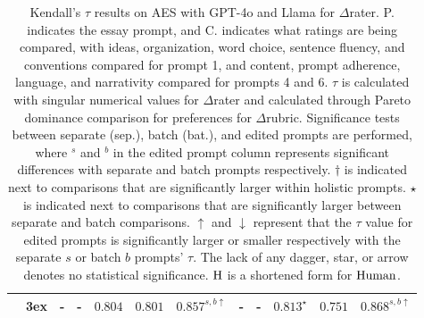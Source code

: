 \begin{table}[!ht]
\begin{tabular}{|w{c}{0.05cm}|w{c}{0.3cm}||c|c||c|c|c||c|c||c|c|c|}
        & 3ex&- &- & $0.804$& $0.801$& $0.857^{s,b\uparrow}$ &- &- & $0.813^{\star}$& $0.751$& $0.868^{s,b\uparrow}$\\
        \hline
    \end{tabular}
    \caption{Kendall's $\tau$ results on AES with GPT-4o and Llama for $\Delta$rater. P. indicates the essay prompt, and C. indicates what ratings are being compared, with ideas, organization, word choice, sentence fluency, and conventions compared for prompt 1, and content, prompt adherence, language, and narrativity compared for prompts 4 and 6. $\tau$ is calculated with singular numerical values for $\Delta$rater and calculated through Pareto dominance comparison for preferences for $\Delta$rubric. Significance tests between separate (sep.), batch (bat.), and edited prompts are performed, where ${^s}$ and ${^b}$ in the edited prompt column represents significant differences with separate and batch prompts respectively. $\dagger$ is indicated next to comparisons that are significantly larger within holistic prompts. $\star$ is indicated next to comparisons that are significantly larger between separate and batch comparisons. $\uparrow$ and $\downarrow$ represent that the $\tau$ value for edited prompts is significantly larger or smaller respectively with the separate $s$ or batch $b$ prompts' $\tau$. The lack of any dagger, star, or arrow denotes no statistical significance. $\textnormal{H}$ is a shortened form for $\textnormal{Human}$. }
    \label{tab:asap_results}
\end{table}


